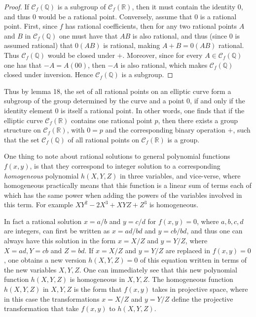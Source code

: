 \documentclass[12pt,letterpaper]{book}
\begin{document}
\begin{proof}
If $\mathscr{C}_f(\mathbb{Q})$ is a subgroup of $\mathscr{C}_f(\mathbb{R})$, then it must contain the identity $0$,
and thus $0$ would be a rational point. Conversely, assume that $0$ is a rational point. First, since $f$ has rational
coefficients, then for any two rational points $A$ and $B$ in $\mathscr{C}_f(\mathbb{Q})$ one must have that $AB$ is
also rational, and thus (since $0$ is assumed rational) that $0(AB)$ is rational, making $A+B=0(AB)$ rational.
Thus $\mathscr{C}_f(\mathbb{Q})$ would be closed under $+$. Moreover, since for every $A\in\mathscr{C}_f(\mathbb{Q})$
one has that $-A=A(00)$, then $-A$ is also rational, which makes $\mathscr{C}_f(\mathbb{Q})$ closed under inversion.
Hence $\mathscr{C}_f(\mathbb{Q})$ is a subgroup.
\end{proof}

Thus by lemma 18, the set of all rational points on an elliptic curve form a subgroup of the group determined by
the curve and a point $0$, if and only if the identity element $0$ is itself a rational point. In other words,
one finds that if the elliptic curve $\mathscr{C}_f(\mathbb{R})$ contains one rational point $p$, then there exists
a group structure on $\mathscr{C}_f(\mathbb{R})$, with $0=p$ and the corresponding binary operation $+$, such that
the set $\mathscr{C}_f(\mathbb{Q})$ of all rational points on $\mathscr{C}_f(\mathbb{R})$ is a group.

One thing to note about rational solutions to general polynomial
functions $f(x,y)$, is that they correspond to integer solution to a
corresponding {\it homogeneous} polynomial $h(X,Y,Z)$ in three
variables, and vice-verse, where homogeneous practically means that
this function is a linear sum of terms each of which has the same
power when adding the powers of the variables involved in this term.
For example $XY^2-2X^3+XYZ+Z^3$ is homogeneous.

In fact a rational solution $x=a/b$ and $y=c/d$ for $f(x,y)=0$,
where $a,b,c,d$ are integers, can first be written as $x=ad/bd$ and
$y=cb/bd$, and thus one can always have this solution in the form
$x=X/Z$ and $y=Y/Z$, where $X=ad, Y=cb$ and $Z=bd$. If $x=X/Z$ and
$y=Y/Z$ are replaced in $f(x,y)=0$, one obtains a new version
$h(X,Y,Z)=0$ of this equation written in terms of the new variables
$X,Y,Z$. One can immediately see that this new polynomial function
$h(X,Y,Z)$ is homogeneous in $X,Y,Z$. The homogeneous function
$h(X,Y,Z)$ in $X,Y,Z$ is the form that $f(x,y)$ takes in projective
space, where in this case the transformations $x=X/Z$ and $y=Y/Z$
define the projective transformation that take $f(x,y)$ to
$h(X,Y,Z)$.
\end{document}
